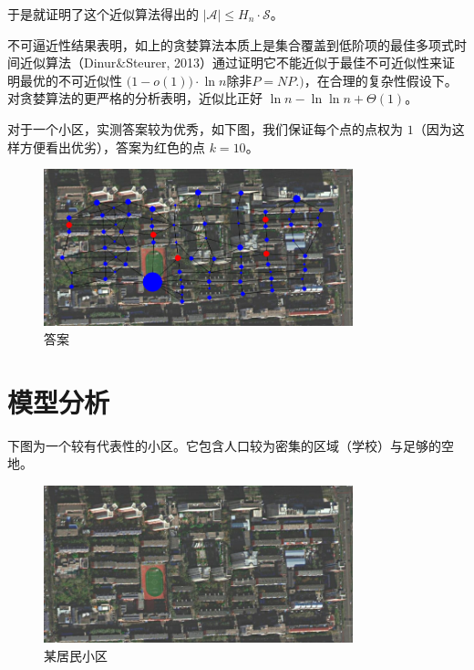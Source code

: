 \documentclass{cumcmthesis}
\begin{document}
于是就证明了这个近似算法得出的 $|\mathscr{A}| \le H_n \cdot \mathscr{S}$。

不可逼近性结果表明，如上的贪婪算法本质上是集合覆盖到低阶项的最佳多项式时间近似算法（Dinur\&Steurer, 2013）通过证明它不能近似于最佳不可近似性来证明最优的不可近似性 ${\displaystyle {\bigl (}1-o(1){\bigr )}\cdot \ln {n}}\text{除非} P{\displaystyle =}NP.)$，在合理的复杂性假设下。对贪婪算法的更严格的分析表明，近似比正好 ${\displaystyle \ln {n}-\ln {\ln {n}}+\Theta(1)}$。

对于一个小区，实测答案较为优秀，如下图，我们保证每个点的点权为 $1$（因为这样方便看出优劣），答案为红色的点 $k=10$。

\begin{figure}[H]
	\centering
	\includegraphics[width=0.80\textwidth]{images/Problem3Subtask2.png}
	\caption{答案}
	\label{fig:mdst-graph}
\end{figure}

\section{模型分析}

下图为一个较有代表性的小区。它包含人口较为密集的区域（学校）与足够的空地。

\begin{figure}[H]
    \centering
    \includegraphics[width=0.8\textwidth]{images/scaled.png}
    \caption{某居民小区}
    \label{fig:scaled}
\end{figure}
\end{document}
